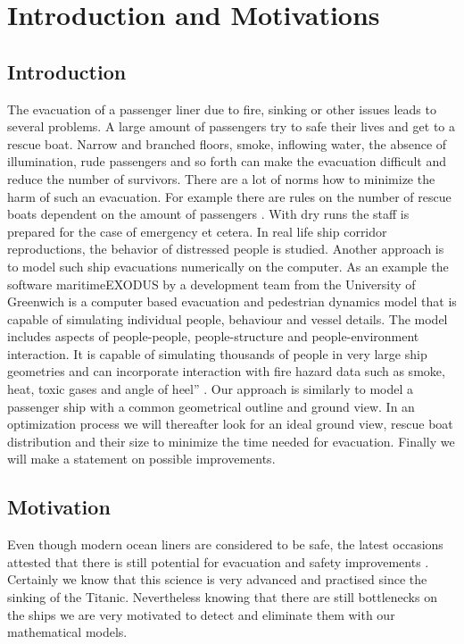 \documentclass[11pt]{article}
\begin{document}
\newpage
\section{Introduction and Motivations}
\subsection{Introduction}
The evacuation of a passenger liner due to fire, sinking or other issues leads to several problems. A large amount of passengers try to safe their lives and get to a rescue boat. Narrow and branched floors, smoke, inflowing water, the absence of illumination, rude passengers and so forth can make the evacuation difficult and reduce the number of survivors.
There are a lot of norms how to minimize the harm of such an evacuation. For example there are rules on the number of rescue boats dependent on the amount of passengers \cite{SOLAS}. With dry runs the staff is prepared for the case of emergency et cetera. In real life ship corridor reproductions, the behavior of distressed people is studied.
Another approach is to model such ship evacuations numerically on the computer. As an example the software maritimeEXODUS by a development team from the University of Greenwich is a computer based evacuation and pedestrian dynamics model that is capable of simulating individual people, behaviour and vessel details. The model includes aspects of people-people, people-structure and people-environment interaction. It is capable of simulating thousands of people in very large ship geometries and can incorporate interaction with fire hazard data such as smoke, heat, toxic gases and angle of heel” \cite{EXODUS}.
Our approach is similarly to model a passenger ship with a common geometrical outline and ground view. In an optimization process we will thereafter look for an ideal ground view, rescue boat distribution and their size to minimize the time needed for evacuation. Finally we will make a statement on possible improvements.
\subsection{Motivation}
Even though modern ocean liners are considered to be safe, the latest occasions attested that there is still potential for evacuation and safety improvements \cite{concordia}. Certainly we know that this science is very advanced and practised since the sinking of the Titanic. Nevertheless knowing that there are still bottlenecks on the ships we are very motivated to detect and eliminate them with our mathematical models.
\end{document}
